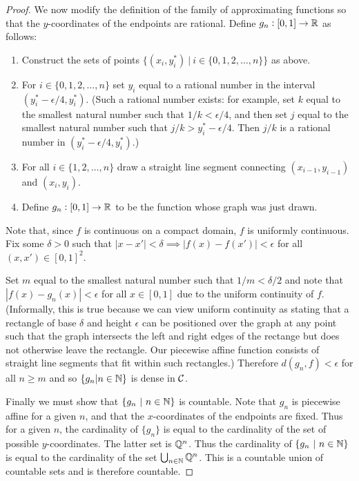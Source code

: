 \begin{enumerate}
\begin{proof}
    We now modify the definition of the family of approximating functions so that the $y$-coordinates of the
    endpoints are rational. Define $g_n: [0, 1] \to \mathbb{R}$ as follows:
    \begin{enumerate}
    \item Construct the sets of points $\{(x_i, y^*_i) ~|~ i \in \{0, 1, 2, \ldots, n\}\}$ as above.
    \item For $i \in \{0, 1, 2, \ldots, n\}$ set $y_i$ equal to a rational number in the
      interval $(y^*_i - \epsilon/4, y^*_i)$. (Such a rational number exists: for example, set $k$ equal to the
      smallest natural number such that $1/k < \epsilon/4$, and then set $j$ equal to the smallest natural number
      such that $j/k > y^*_i - \epsilon/4$. Then $j/k$ is a rational number in $(y^*_i - \epsilon/4, y^*_i)$.)
    \item For all $i \in \{1, 2, \ldots, n\}$ draw a straight line segment connecting $(x_{i-1}, y_{i-1})$
      and $(x_i, y_i)$.
    \item Define $g_n: [0, 1] \to \mathbb{R}$ to be the function whose graph was just drawn.
    \end{enumerate}
    Note that, since $f$ is continuous on a compact domain, $f$ is uniformly continuous. Fix some $\delta > 0$ such
    that $|x - x'| < \delta \implies |f(x) - f(x')| < \epsilon$ for all $(x, x') \in [0, 1]^2$.

    Set $m$ equal to the smallest natural number such that $1/m < \delta/2$ and note
    that $|f(x) - g_n(x)| < \epsilon$ for all $x \in [0, 1]$ due to the uniform continuity of $f$. (Informally,
    this is true because we can view uniform continuity as stating that a rectangle of base $\delta$ and
    height $\epsilon$ can be positioned over the graph at any point such that the graph intersects the left and
    right edges of the rectange but does not otherwise leave the rectangle. Our piecewise affine function
    consists of straight line segments that fit within such rectangles.) Therefore $d(g_n, f) < \epsilon$ for
    all $n \geq m$ and so $\{g_n | n \in \mathbb{N}\}$ is dense in $\mathcal C$.

    Finally we must show that $\{g_n ~|~ n \in \mathbb{N}\}$ is countable. Note that $g_n$ is piecewise affine for a
    given $n$, and that the $x$-coordinates of the endpoints are fixed. Thus for a given $n$, the cardinality
    of $\{g_n\}$ is equal to the cardinality of the set of possible $y$-coordinates. The latter set is $\mathbb{Q}^n$.
    Thus the cardinality of $\{g_n ~|~ n \in \mathbb{N}\}$ is equal to the cardinality of the
    set $\bigcup_{n\in \mathbb{N}} \mathbb{Q}^n$. This is a countable union of countable sets and is therefore countable.
  \end{proof}


\end{enumerate}
